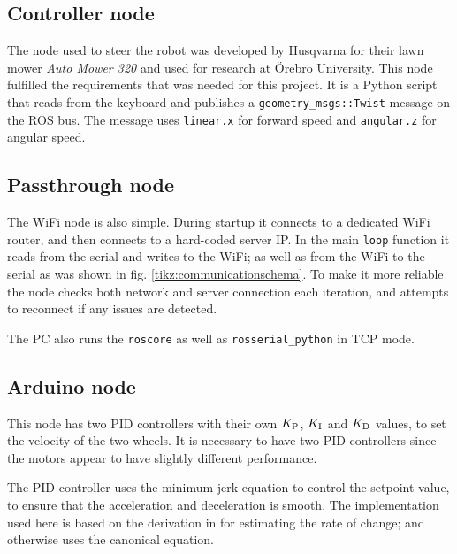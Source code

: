 \documentclass[11pt]{article}
\begin{document}
\newpage


\subsection{Controller node}
The node used to steer the robot was developed by Husqvarna for their lawn mower
\emph{Auto Mower 320} and used for research at Örebro University. This node
fulfilled the requirements that was needed for this project. It is a Python
script that reads from the keyboard and publishes a
\texttt{geometry\_msgs::Twist} message on the ROS bus. The message uses
\texttt{linear.x} for forward speed and \texttt{angular.z} for angular speed.
\label{subsec:cn}


\subsection{Passthrough node}
\label{subsec:ptn}
The WiFi node is also simple. During startup it connects to a dedicated WiFi
router, and then connects to a hard-coded server IP. In the main \texttt{loop}
function it reads from the serial and writes to the WiFi; as well as from the
WiFi to the serial as was shown in fig. \vref{tikz:communicationschema}. To make
it more reliable the node checks both network and server connection each
iteration, and attempts to reconnect if any issues are detected. \par
The PC also runs the \texttt{roscore} as well as \texttt{rosserial_python} in
TCP mode.
\subsection{Arduino node}
\label{subsec:dd}
This node has two PID controllers with their own ${K_{\textup{P}}}$, ${K_{\textup{I}}}$ and
${K_{\textup{D}}}$ values, to set the velocity of the two wheels. It is necessary to
have two PID controllers since the motors appear to have slightly different
performance. \par

The PID controller uses the minimum jerk equation to control the setpoint value,
to ensure that the acceleration and deceleration is smooth. The implementation
used here is based on the derivation in \cite{mje} for estimating the rate of
change; and otherwise uses the canonical equation. \par
\end{document}
